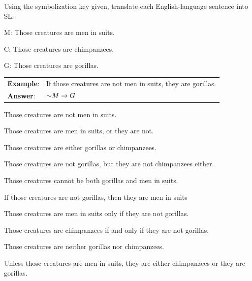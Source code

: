\practiceproblems
\noindent\problempart Using the symbolization key given, translate each English-language sentence into SL.
\label{pr.monkeysuits}
\begin{ekey}
\item[M:] Those creatures are men in suits.
\item[C:] Those creatures are chimpanzees.
\item[G:] Those creatures are gorillas.
\end{ekey}

\begin{longtabu}{p{.1\linewidth}p{.9\linewidth}}
\textbf{Example}: & If those creatures are not men in suits, they are gorillas. \\
\textbf{Answer}: & $\mathord{\sim} M \rightarrow G$ \\
\end{longtabu}


\begin{exercises}
\item Those creatures are not men in suits. 
\item Those creatures are men in suits, or they are not. 
\item Those creatures are either gorillas or chimpanzees. 
\item Those creatures are not gorillas, but they are not chimpanzees either. 
\item Those creatures cannot be both gorillas and men in suits. 
\item If those creatures are not gorillas, then they are men in suits 
\item Those creatures are men in suits only if they are not gorillas. 
\item Those creatures are chimpanzees if and only if they are not gorillas. 
\item Those creatures are neither gorillas nor chimpanzees.  %
\item Unless those creatures are men in suits, they are either chimpanzees or they are gorillas. 
\end{exercises}



